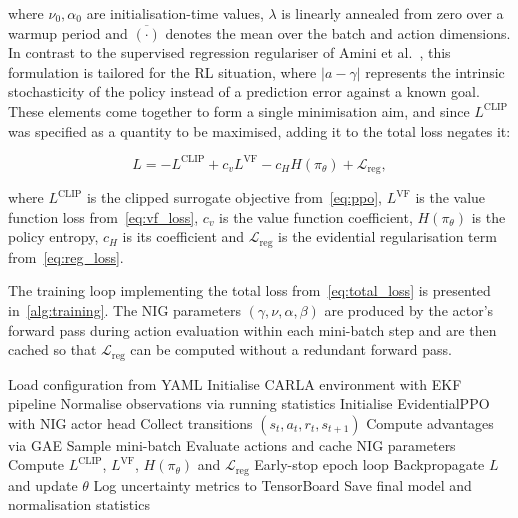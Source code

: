 \documentclass{sig-alternate}
\begin{document}
\noindent where $\nu_0, \alpha_0$ are initialisation-time values, $\lambda$ is linearly annealed from zero over a warmup period and $\overline{(\cdot)}$ denotes the mean over the batch and action dimensions. In contrast to the supervised regression regulariser of Amini et al.~\cite{amini2020deep}, this formulation is tailored for the RL situation, where $|a - \gamma|$ represents the intrinsic stochasticity of the policy instead of a prediction error against a known goal. These elements come together to form a single minimisation aim, and since $L^{\text{CLIP}}$ was specified as a quantity to be maximised, adding it to the total loss negates it:

\begin{equation}
    L = -L^{\text{CLIP}} + c_v L^{\text{VF}} - c_H H(\pi_\theta) + \mathcal{L}_{\text{reg}},
    \label{eq:total_loss}
\end{equation}

\noindent where $L^{\text{CLIP}}$ is the clipped surrogate objective from~\cref{eq:ppo}, $L^{\text{VF}}$ is the value function loss from~\cref{eq:vf_loss}, $c_v$ is the value function coefficient, $H(\pi_\theta)$ is the policy entropy, $c_H$ is its coefficient and $\mathcal{L}_{\text{reg}}$ is the evidential regularisation term from~\cref{eq:reg_loss}.

The training loop implementing the total loss from~\cref{eq:total_loss} is presented in~\cref{alg:training}. The NIG parameters $(\gamma, \nu, \alpha, \beta)$ are produced by the actor's forward pass during action evaluation within each mini-batch step and are then cached so that $\mathcal{L}_{\text{reg}}$ can be computed without a redundant forward pass. 
\begin{algorithm}[htbp]
    \caption{Evidential PPO training loop.\label{alg:training}}
    \begin{algorithmic}[1]
        \State Load configuration from YAML
        \State Initialise CARLA environment with EKF pipeline
        \State Normalise observations via running statistics
        \State Initialise EvidentialPPO with NIG actor head
            \State Collect transitions $(s_t, a_t, r_t, s_{t+1})$
            \State Compute advantages via GAE
                \State Sample mini-batch
                \State Evaluate actions and cache NIG parameters 
                \State Compute $L^{\text{CLIP}}$, $L^{\text{VF}}$, $H(\pi_\theta)$ and $\mathcal{L}_{\text{reg}}$
                    \State Early-stop epoch loop
                \EndIf
                \State Backpropagate $L$ and update $\theta$
            \EndFor
            \State Log uncertainty metrics to TensorBoard
        \EndFor
        \State Save final model and normalisation statistics
    \end{algorithmic}
\end{algorithm}
\end{document}
